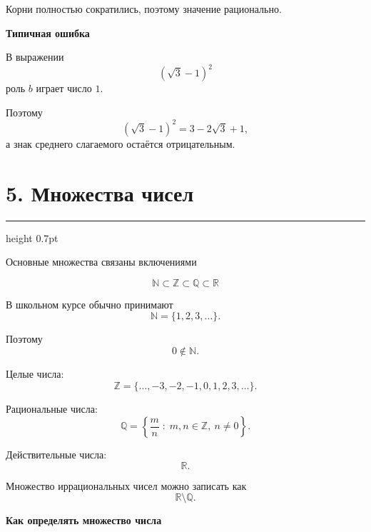\documentclass[a4paper,12pt]{article}
\newcommand{\N}{\mathbb{N}}
\newcommand{\Z}{\mathbb{Z}}
\newcommand{\Q}{\mathbb{Q}}
\newcommand{\R}{\mathbb{R}}
\newcommand{\key}[1]{%
    \par\medskip
    {\color{darkaccent}\bfseries #1}
    \par\smallskip
}
\newcommand{\ruleline}{%
    \par\medskip
    {\color{accent}\hrule height 0.7pt}
    \medskip
}
\begin{document}
Корни полностью сократились, поэтому значение рационально.

\key{Типичная ошибка}

В выражении
\[
(\sqrt3-1)^2
\]
роль \(b\) играет число \(1\).

Поэтому
\[
(\sqrt3-1)^2
=
3-2\sqrt3+1,
\]
а знак среднего слагаемого остаётся отрицательным.


\section*{\textcolor{darkaccent}{5. Множества чисел}}

\ruleline

Основные множества связаны включениями

\[
\boxed{
\N\subset\Z\subset\Q\subset\R
}
\]

В школьном курсе обычно принимают
\[
\N=\{1,2,3,\ldots\}.
\]

Поэтому
\[
0\notin\N.
\]

Целые числа:
\[
\Z=
\{\ldots,-3,-2,-1,0,1,2,3,\ldots\}.
\]

Рациональные числа:
\[
\Q=
\left\{
\frac{m}{n}\;:\;
m,n\in\Z,\ n\ne0
\right\}.
\]

Действительные числа:
\[
\R.
\]

Множество иррациональных чисел можно записать как
\[
\R\setminus\Q.
\]

\begin{center}
\end{center}

\key{Как определять множество числа}
\end{document}

